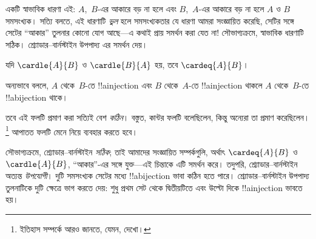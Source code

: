 \documentclass[../../../include/open-logic-section]{subfiles}
\begin{document}


\begin{explain}
একটি স্বাভাবিক ধারণা এই: $A$,~$B$-এর আকারে বড় না হলে এবং $B$,~$A$-এর আকারে বড় না হলে $A$ ও $B$ সমসংখ্যক। সত্যি বলতে, এই ধারণাটি \emph{ভুল} হলে সমসংখ্যকতার যে ধারণা আমরা সংজ্ঞায়িত করেছি, সেটির সঙ্গে সেটের ``আকার'' তুলনার কোনো যোগ আছে—এ কথাই প্রায় সমর্থন করা যেত না!{} সৌভাগ্যক্রমে, স্বাভাবিক ধারণাটি সঠিক। শ্র্যোডার--বার্নস্টাইন উপপাদ্য এর সমর্থন দেয়।
\end{explain}

\begin{thm}[শ্র্যোডার--বার্নস্টাইন]
	যদি $\cardle{A}{B}$ ও $\cardle{B}{A}$ হয়,
	তবে $\cardeq{A}{B}$।
\end{thm}

\begin{explain}
অন্যভাবে বললে, $A$ থেকে~$B$-তে !!a{injection} এবং $B$ থেকে~$A$-তে !!a{injection} থাকলে $A$ থেকে~$B$-তে !!a{bijection} থাকে।

তবে এই ফলটি প্রমাণ করা সত্যিই বেশ \emph{কঠিন}। বস্তুত, কান্টর ফলটি বলেছিলেন, কিন্তু অন্যেরা তা প্রমাণ করেছিলেন।\footnote{ইতিহাস সম্পর্কে আরও জানতে, যেমন, \citet[pp.~165--6]{Potter2004} দেখো।}
%
আপাতত ফলটি মেনে নিয়ে ব্যবহার করতে হবে।

সৌভাগ্যক্রমে, শ্র্যোডার--বার্নস্টাইন \emph{সঠিক}; তাই আমাদের সংজ্ঞায়িত সম্পর্কগুলি, অর্থাৎ $\cardeq{A}{B}$ ও $\cardle{A}{B}$, ``আকার''-এর সঙ্গে যুক্ত—এই চিন্তাকে এটি সমর্থন করে। তদুপরি, শ্র্যোডার--বার্নস্টাইন অত্যন্ত \emph{উপযোগী}। দুটি সমসংখ্যক সেটের মধ্যে !!a{bijection} ভাবা কঠিন হতে পারে। শ্র্যোডার--বার্নস্টাইন উপপাদ্য তুলনাটিকে দুটি ক্ষেত্রে ভাগ করতে দেয়: শুধু প্রথম সেট থেকে দ্বিতীয়টিতে এবং উল্টো দিকে !!a{injection} ভাবতে হয়।
\end{explain}
\end{document}
